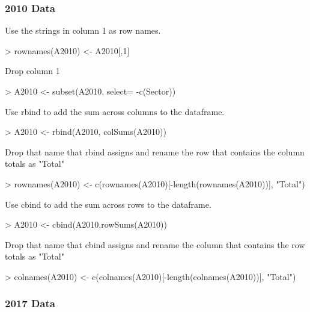 \documentclass[letterpaper]{article}
\begin{document}
\subsubsection{2010 Data}

Use the strings in column 1 as row names.
\begin{Schunk}
\begin{Sinput}
> rownames(A2010) <- A2010[,1]
\end{Sinput}
\end{Schunk}

Drop column 1
\begin{Schunk}
\begin{Sinput}
> A2010 <-  subset(A2010, select= -c(Sector))
\end{Sinput}
\end{Schunk}

Use rbind to add the sum across columns to the dataframe.
\begin{Schunk}
\begin{Sinput}
> A2010 <- rbind(A2010, colSums(A2010))
\end{Sinput}
\end{Schunk}

Drop that name that rbind assigns and rename the row that contains the column totals as "Total"
\begin{Schunk}
\begin{Sinput}
> rownames(A2010) <- c(rownames(A2010)[-length(rownames(A2010))], "Total")
\end{Sinput}
\end{Schunk}

Use cbind to add the sum across rows to the dataframe.
\begin{Schunk}
\begin{Sinput}
> A2010 <- cbind(A2010,rowSums(A2010))
\end{Sinput}
\end{Schunk}

Drop that name that cbind assigns and rename the column that contains the row totals as "Total"
\begin{Schunk}
\begin{Sinput}
> colnames(A2010) <- c(colnames(A2010)[-length(colnames(A2010))], "Total")
\end{Sinput}
\end{Schunk}

\subsubsection{2017 Data}
\end{document}
